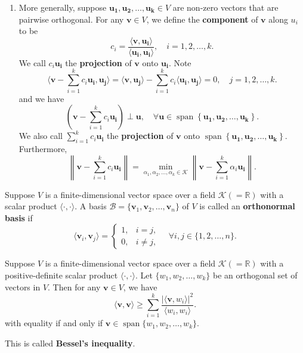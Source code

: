 \documentclass{ctexart}
\begin{document}
\begin{mypro}
\begin{enumerate}
\[			\]
			\item More generally, suppose $\mathbf{u_1}, \mathbf{u_2}, \dots, \mathbf{u_k} \in V$ are non-zero vectors that are pairwise orthogonal. For any $\mathbf{v} \in V$, we define the \textbf{component} of $\mathbf{v}$ along $u_i$ to be 
			\[
			c_i = \frac{\langle \mathbf{v}, \mathbf{u_i} \rangle}{\langle \mathbf{u_i}, \mathbf{u_i} \rangle}, \quad i=1,2,\ldots,k.
			\]
			We call $c_i \mathbf{u_i}$ the \textbf{projection} of $\mathbf{v}$ onto $\mathbf{u_i}$. Note
			\[
			\langle \mathbf{v} - \sum_{i=1}^k c_i \mathbf{u_i}, \mathbf{u_j} \rangle = \langle \mathbf{v}, \mathbf{u_j} \rangle - \sum_{i=1}^k c_i \langle \mathbf{u_i}, \mathbf{u_j} \rangle = 0, \quad j=1,2,\ldots,k.
			\]
			and we have
			\[
			\left( \mathbf{v}- \sum_{i=1}^k c_i \mathbf{u_i} \right) \perp \mathbf{u}, \quad \forall \mathbf{u}\in \operatorname{span}\left\{ \mathbf{u_1}, \mathbf{u_2}, \ldots, \mathbf{u_k} \right\}.
			\]
			We also call $\sum\limits_{i=1}^k c_i \mathbf{u_i}$ the \textbf{projection} of $\mathbf{v}$ onto $\operatorname{span}\left\{ \mathbf{u_1}, \mathbf{u_2}, \ldots, \mathbf{u_k} \right\}$.
			Furthermore,
			\[
			\left\| \mathbf{v} - \sum_{i=1}^k c_i \mathbf{u_i} \right\| = \min_{\alpha_1, \alpha_2, \ldots, \alpha_k \in \mathcal{K}} \left\| \mathbf{v} - \sum_{i=1}^k \alpha_i \mathbf{u_i} \right\|.
			\]
		\end{enumerate}
	\end{mypro}
	\begin{mydef}
		Suppose $V$ is a finite-dimensional vector space over a field $\mathcal{K}\left( = \mathbb{R} \right)$ with a scalar product $\langle \cdot, \cdot \rangle$. A basis $\mathcal{B} = \{\mathbf{v}_1, \mathbf{v}_2, \dots, \mathbf{v}_n\}$ of $V$ is called an \textbf{orthonormal basis} if
		\[
		\langle \mathbf{v}_i, \mathbf{v}_j \rangle =
		\begin{cases}
		1, & i = j, \\
		0, & i \neq j,
		\end{cases}
		\quad \forall i,j \in \{1,2,\ldots,n\}.
		\]
	\end{mydef}
	\begin{mythm}
		Suppose $V$ is a finite-dimensional vector space over a field $\mathcal{K}\left( = \mathbb{R} \right)$ with a positive-definite scalar product $\langle \cdot, \cdot \rangle$. Let $\{w_1, w_2, \ldots, w_k\}$ be an orthogonal set of vectors in $V$. Then for any $\mathbf{v} \in V$, we have
		\[
		\langle \mathbf{v}, \mathbf{v} \rangle \geq \sum_{i=1}^k \frac{|\langle \mathbf{v}, w_i \rangle|^2}{\langle w_i, w_i \rangle}.
		\]
		with equality if and only if $\mathbf{v} \in \operatorname{span}\{w_1, w_2, \ldots, w_k\}$.

		This is called \textbf{Bessel's inequality}.
	\end{mythm}
\end{document}
